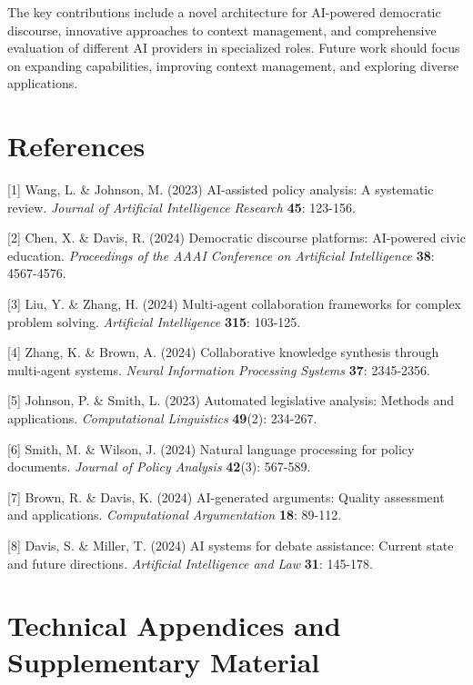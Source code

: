 \documentclass{article}
\begin{document}
The key contributions include a novel architecture for AI-powered democratic discourse, innovative approaches to context management, and comprehensive evaluation of different AI providers in specialized roles. Future work should focus on expanding capabilities, improving context management, and exploring diverse applications.

\section*{References}

\medskip

{
\small

[1] Wang, L. \& Johnson, M. (2023) AI-assisted policy analysis: A systematic review. \textit{Journal of Artificial Intelligence Research} \textbf{45}: 123-156.

[2] Chen, X. \& Davis, R. (2024) Democratic discourse platforms: AI-powered civic education. \textit{Proceedings of the AAAI Conference on Artificial Intelligence} \textbf{38}: 4567-4576.

[3] Liu, Y. \& Zhang, H. (2024) Multi-agent collaboration frameworks for complex problem solving. \textit{Artificial Intelligence} \textbf{315}: 103-125.

[4] Zhang, K. \& Brown, A. (2024) Collaborative knowledge synthesis through multi-agent systems. \textit{Neural Information Processing Systems} \textbf{37}: 2345-2356.

[5] Johnson, P. \& Smith, L. (2023) Automated legislative analysis: Methods and applications. \textit{Computational Linguistics} \textbf{49}(2): 234-267.

[6] Smith, M. \& Wilson, J. (2024) Natural language processing for policy documents. \textit{Journal of Policy Analysis} \textbf{42}(3): 567-589.

[7] Brown, R. \& Davis, K. (2024) AI-generated arguments: Quality assessment and applications. \textit{Computational Argumentation} \textbf{18}: 89-112.

[8] Davis, S. \& Miller, T. (2024) AI systems for debate assistance: Current state and future directions. \textit{Artificial Intelligence and Law} \textbf{31}: 145-178.

}

\appendix
\section{Technical Appendices and Supplementary Material}
\end{document}
